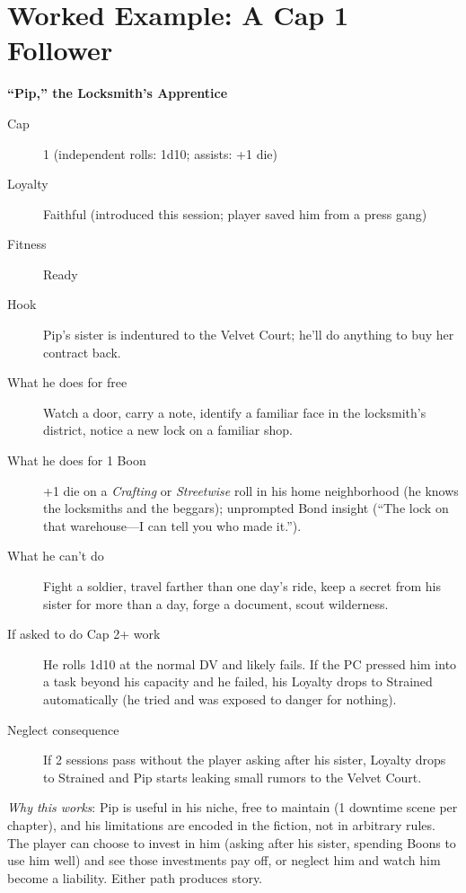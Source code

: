 \section{Worked Example: A Cap 1 Follower}
\label{sec:cap-1-example}

\textbf{``Pip,'' the Locksmith's Apprentice}

\begin{description}
  \item[Cap] 1 (independent rolls: 1d10; assists: +1 die)
  \item[Loyalty] Faithful (introduced this session; player saved him from a press gang)
  \item[Fitness] Ready
  \item[Hook] Pip's sister is indentured to the Velvet Court; he'll do anything to buy her contract back.
  \item[What he does for free] Watch a door, carry a note, identify a familiar face in the locksmith's district, notice a new lock on a familiar shop.
  \item[What he does for 1 Boon] +1 die on a \textit{Crafting} or \textit{Streetwise} roll in his home neighborhood (he knows the locksmiths and the beggars); unprompted Bond insight (``The lock on that warehouse---I can tell you who made it.'').
  \item[What he can't do] Fight a soldier, travel farther than one day's ride, keep a secret from his sister for more than a day, forge a document, scout wilderness.
  \item[If asked to do Cap 2+ work] He rolls 1d10 at the normal DV and likely fails. If the PC pressed him into a task beyond his capacity and he failed, his Loyalty drops to Strained automatically (he tried and was exposed to danger for nothing).
  \item[Neglect consequence] If 2 sessions pass without the player asking after his sister, Loyalty drops to Strained and Pip starts leaking small rumors to the Velvet Court.
\end{description}

\textit{Why this works}: Pip is useful in his niche, free to maintain (1 downtime scene per chapter), and his limitations are encoded in the fiction, not in arbitrary rules. The player can choose to invest in him (asking after his sister, spending Boons to use him well) and see those investments pay off, or neglect him and watch him become a liability. Either path produces story.

